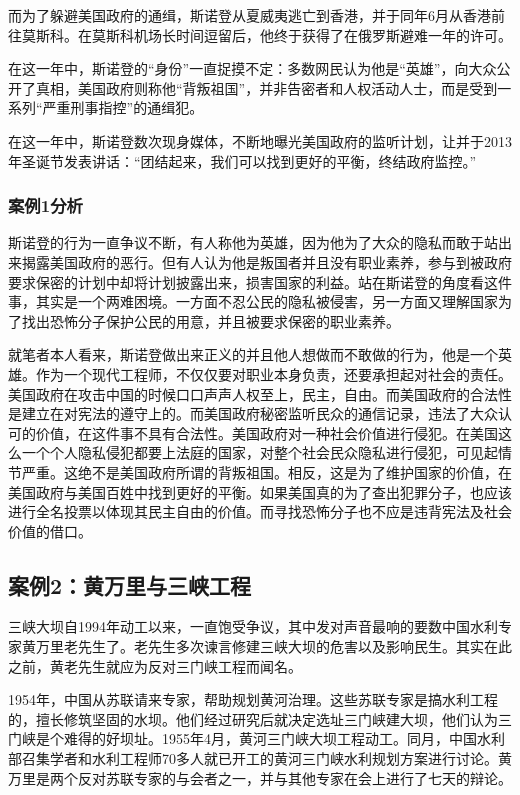\documentclass[a4paper,12pt]{ctexart}
\begin{document}
而为了躲避美国政府的通缉，斯诺登从夏威夷逃亡到香港，并于同年6月从香港前往莫斯科。在莫斯科机场长时间逗留后，他终于获得了在俄罗斯避难一年的许可。

在这一年中，斯诺登的“身份”一直捉摸不定：多数网民认为他是“英雄”，向大众公开了真相，美国政府则称他“背叛祖国”，并非告密者和人权活动人士，而是受到一系列“严重刑事指控”的通缉犯。

在这一年中，斯诺登数次现身媒体，不断地曝光美国政府的监听计划，让并于2013年圣诞节发表讲话：“团结起来，我们可以找到更好的平衡，终结政府监控。”
\subsubsection{案例1分析}
斯诺登的行为一直争议不断，有人称他为英雄，因为他为了大众的隐私而敢于站出来揭露美国政府的恶行。但有人认为他是叛国者并且没有职业素养，参与到被政府要求保密的计划中却将计划披露出来，损害国家的利益。站在斯诺登的角度看这件事，其实是一个两难困境。一方面不忍公民的隐私被侵害，另一方面又理解国家为了找出恐怖分子保护公民的用意，并且被要求保密的职业素养。

就笔者本人看来，斯诺登做出来正义的并且他人想做而不敢做的行为，他是一个英雄。作为一个现代工程师，不仅仅要对职业本身负责，还要承担起对社会的责任。美国政府在攻击中国的时候口口声声人权至上，民主，自由。而美国政府的合法性是建立在对宪法的遵守上的。而美国政府秘密监听民众的通信记录，违法了大众认可的价值，在这件事不具有合法性。美国政府对一种社会价值进行侵犯。在美国这么一个个人隐私侵犯都要上法庭的国家，对整个社会民众隐私进行侵犯，可见起情节严重。这绝不是美国政府所谓的背叛祖国。相反，这是为了维护国家的价值，在美国政府与美国百姓中找到更好的平衡。如果美国真的为了查出犯罪分子，也应该进行全名投票以体现其民主自由的价值。而寻找恐怖分子也不应是违背宪法及社会价值的借口。


\subsection{案例2：黄万里与三峡工程}
三峡大坝自1994年动工以来，一直饱受争议，其中发对声音最响的要数中国水利专家黄万里老先生了。老先生多次谏言修建三峡大坝的危害以及影响民生。其实在此之前，黄老先生就应为反对三门峡工程而闻名。

1954年，中国从苏联请来专家，帮助规划黄河治理。这些苏联专家是搞水利工程的，擅长修筑坚固的水坝。他们经过研究后就决定选址三门峡建大坝，他们认为三门峡是个难得的好坝址。1955年4月，黄河三门峡大坝工程动工。同月，中国水利部召集学者和水利工程师70多人就已开工的黄河三门峡水利规划方案进行讨论。黄万里是两个反对苏联专家的与会者之一，并与其他专家在会上进行了七天的辩论。
\end{document}
